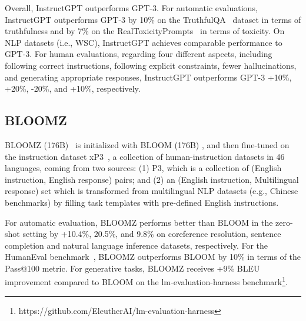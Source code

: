 \documentclass[11pt]{article}
\begin{document}
Overall, InstructGPT outperforms GPT-3. For automatic evaluations, InstructGPT outperforms GPT-3  by 10\% on the TruthfulQA~\citep{Lin2021TruthfulQAMH} dataset in terms of truthfulness and by 7\% on the RealToxicityPrompts~\citep{Gehman2020RealToxicityPromptsEN} in terms of toxicity. On NLP datasets  (i.e., WSC), InstructGPT achieves comparable performance to GPT-3.  For human evaluations, regarding four different aspects, including following correct instructions, following explicit constraints, fewer hallucinations, and generating appropriate responses, InstructGPT outperforms GPT-3 +10\%, +20\%, -20\%, and +10\%, respectively. %

\subsection{BLOOMZ}

BLOOMZ (176B)~\citep{muennighoff2022crosslingual} is initialized with BLOOM (176B) \cite{Scao2022BLOOMA1},  and then fine-tuned on the instruction dataset xP3~\citep{muennighoff2022crosslingual},
a collection of human-instruction datasets in 46 languages, coming from two sources: (1) P3, which is a collection of  (English instruction, English response) pairs; and (2) an  (English instruction, Multilingual response) set which is transformed from multilingual NLP datasets (e.g., Chinese benchmarks) by filling task templates with pre-defined English instructions. 

For automatic evaluation, BLOOMZ performs better than BLOOM in the zero-shot setting by +10.4\%, 20.5\%, and 9.8\% on coreference resolution, sentence completion and natural language inference datasets, respectively. For the HumanEval benchmark~\citep{Chen2021EvaluatingLL}, BLOOMZ outperforms BLOOM by 10\% in terms of the Pass@100 metric. For generative tasks, BLOOMZ receives +9\% BLEU improvement compared to BLOOM on the lm-evaluation-harness benchmark\footnote{https://github.com/EleutherAI/lm-evaluation-harness}. 
\end{document}
